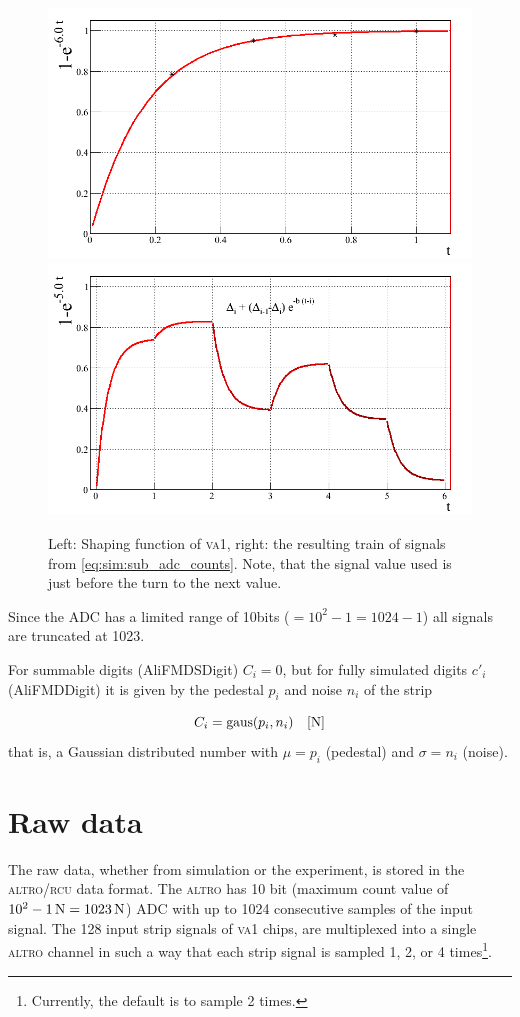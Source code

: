 \documentclass[11pt]{article}
\def\N#1{\unit[#1]{N}}
\def\ALTRO{{\scshape altro}}
\def\RCU{{\scshape rcu}}
\def\VA{{\scshape va1}}
\def\class#1{{\small\ttfamily #1}}
\begin{document}
\begin{figure}[Htbp]
  \centering
  \includegraphics[keepaspectratio,width=.45\textwidth]{va1_response}
  \includegraphics[keepaspectratio,width=.45\textwidth]{va1_train}
  \caption{Left: Shaping function of \VA{}, right: the resulting train
    of signals from \eqref{eq:sim:sub_adc_counts}. Note, that the
    signal value used is just before the turn to the next value.}
  \label{fig:sim:va1_response}
\end{figure}

Since the ADC has a limited range of 10bits ($=10^2-1=1024-1$) all
signals are truncated at 1023. 

For summable digits (\class{AliFMDSDigit}) $C_i=0$, but for 
fully simulated digits $c'_i$ (\class{AliFMDDigit}) it is given by
the pedestal $p_i$ and noise $n_i$ of the strip

\begin{equation}
  \label{eq:sim:pedestal_value}
  C_i = \text{gaus}(p_i,n_i)\quad[\N{}]
\end{equation}
that is, a Gaussian distributed number with $\mu=p_i$ (pedestal) and
$\sigma=n_i$ (noise). 

\section*{Raw data} 

The raw data, whether from simulation or the experiment, is stored in
the \ALTRO{}/\RCU{} data format.  The \ALTRO{} has 10 bit (maximum
count value of $\N{10^2-1}=\N{1023}$) ADC with up to 1024 consecutive
samples of the input signal.  The 128 input strip signals of \VA{}
chips, are multiplexed into a single \ALTRO{} channel in such a way
that each strip signal is sampled 1, 2, or 4 times\footnote{Currently,
  the default is to sample 2 times.}.  
\end{document}
